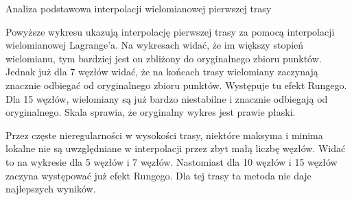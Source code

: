 \documentclass{article}
\begin{document}
\begin{section}{Analiza podstawowa interpolacji wielomianowej pierwszej trasy}
\begin{figure}[H]
  \end{figure}
  \begin{figure}[H]
    \centering
  \end{figure}

  Powyższe wykresu ukazują interpolację pierwszej trasy za pomocą interpolacji wielomianowej Lagrange'a.
  Na wykresach widać, że im większy stopień wielomianu, tym bardziej jest on zbliżony do oryginalnego zbioru punktów.
  Jednak już dla 7 węzłów widać, że na końcach trasy wielomiany zaczynają znacznie odbiegać od oryginalnego zbioru punktów.
  Występuje tu efekt Rungego. Dla 15 węzłów, wielomiany są już bardzo niestabilne i znacznie odbiegają od oryginalnego.
  Skala sprawia, że oryginalny wykres jest prawie płaski.

  Przez częste nieregularności w wysokości trasy, niektóre maksyma i minima lokalne nie są uwzględniane w interpolacji
  przez zbyt małą liczbę węzłów. Widać to na wykresie dla 5 węzłów i 7 węzłów. Nastomiast dla 10 węzłów i 15 węzłów
  zaczyna występować już efekt Rungego. Dla tej trasy ta metoda nie daje najlepszych wyników.
\end{section}
\end{document}
